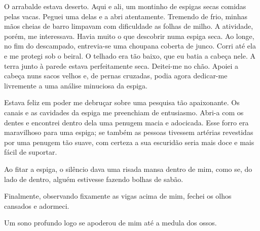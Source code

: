 O arrabalde estava deserto. Aqui e ali, um montinho de espigas secas comidas
pelas vacas. Peguei uma delas e a abri atentamente. Tremendo de frio, minhas
mãos cheias de barro limpavam com dificuldade as folhas de milho. A
atividade, porém, me interessava. Havia muito o que descobrir numa espiga
seca. Ao longe, no fim do descampado, entrevia-se uma choupana coberta de
junco. Corri até ela e me protegi sob o beiral. O telhado era tão baixo, que
eu batia a cabeça nele. A terra junto à parede estava perfeitamente seca.
Deitei-me no chão. Apoiei a cabeça nuns sacos velhos e, de pernas cruzadas,
podia agora dedicar-me livremente a uma análise minuciosa da espiga.

Estava feliz em poder me debruçar sobre uma pesquisa tão apaixonante. Os
canais e as cavidades da espiga me preenchiam de entusiasmo. Abri-a com os
dentes e encontrei dentro dela uma penugem macia e adocicada. Esse forro era
maravilhoso para uma espiga; se também as pessoas tivessem artérias
revestidas por uma penugem tão suave, com certeza a sua escuridão seria mais
doce e mais fácil de suportar.

Ao fitar a espiga, o silêncio dava uma risada mansa dentro de mim, como se, do
lado de dentro, alguém estivesse fazendo bolhas de sabão.



Finalmente, observando fixamente as vigas acima de mim, fechei os olhos
cansados e adormeci.

Um sono profundo logo se apoderou de mim até a medula dos ossos.


